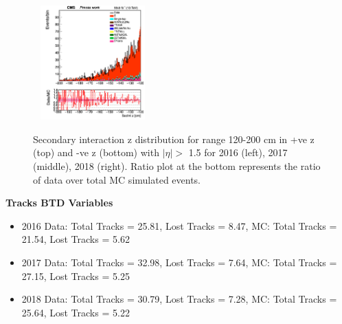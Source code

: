 \documentclass{cernatlasnote}
\begin{document}
\begin{figure}[htp]
 \includegraphics[width=4.6cm, height=4.4cm]{images/emu_channel/2018/18_Plots_for_r_z/SecInt_z_Selec_eta_minus_z_120_200_Linear.png}\\
 \caption{Secondary interaction z distribution for range 120-200 cm in +ve z (top) and -ve z (bottom) with $|\eta|>$ 1.5 for 2016 (left), 2017 (middle), 2018 (right). Ratio plot at the bottom represents the ratio of data over total MC simulated events.}
 \label{fig:L0DATAMC}
  \end{figure}

 \textbf{Tracks BTD Variables} 
\begin{itemize}
          \item 2016 Data: Total Tracks = 25.81, Lost Tracks = 8.47,  MC: Total Tracks = 21.54, Lost Tracks = 5.62\\
             \vspace{-0.1cm}
           \item 2017 Data: Total Tracks = 32.98, Lost Tracks = 7.64,  MC: Total Tracks = 27.15, Lost Tracks  = 5.25\\
              \vspace{-0.1cm}
            \item 2018 Data: Total Tracks = 30.79, Lost Tracks = 7.28,  MC: Total Tracks = 25.64,  Lost Tracks = 5.22\\
    \end{itemize}
\end{document}
